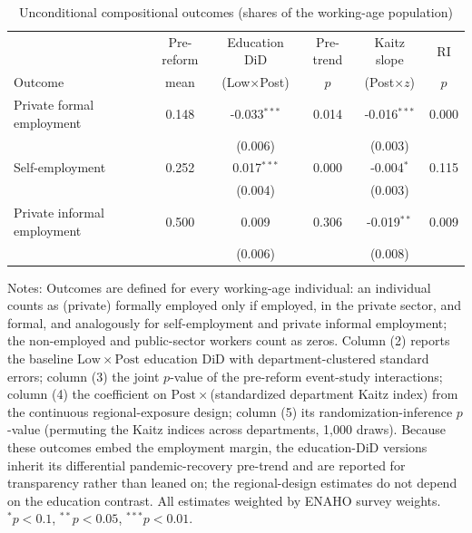 \begin{table}[!tbp]\centering
\caption{Unconditional compositional outcomes (shares of the working-age population)}\label{tab:uncond}
\begin{threeparttable}
\footnotesize
\setlength{\tabcolsep}{4pt}
\begin{tabular}{lccccc}
\toprule
& Pre-reform & Education DiD & Pre-trend & Kaitz slope & RI \\
Outcome & mean & (Low$\times$Post) & $p$ & (Post$\times z$) & $p$ \\
\midrule
Private formal employment & 0.148 & -0.033$^{***}$ & 0.014 & -0.016$^{***}$ & 0.000 \\
 & & (0.006) & & (0.003) & \\
Self-employment & 0.252 & 0.017$^{***}$ & 0.000 & -0.004$^{*}$ & 0.115 \\
 & & (0.004) & & (0.003) & \\
Private informal employment & 0.500 & 0.009 & 0.306 & -0.019$^{**}$ & 0.009 \\
 & & (0.006) & & (0.008) & \\
\bottomrule
\end{tabular}
\begin{tablenotes}\footnotesize
\item Notes: Outcomes are defined for every working-age individual: an individual counts as (private) formally employed only if employed, in the private sector, and formal, and analogously for self-employment and private informal employment; the non-employed and public-sector workers count as zeros. Column (2) reports the baseline $\mathrm{Low}\times\mathrm{Post}$ education DiD with department-clustered standard errors; column (3) the joint $p$-value of the pre-reform event-study interactions; column (4) the coefficient on $\mathrm{Post}\times$(standardized department Kaitz index) from the continuous regional-exposure design; column (5) its randomization-inference $p$-value (permuting the Kaitz indices across departments, 1{,}000 draws). Because these outcomes embed the employment margin, the education-DiD versions inherit its differential pandemic-recovery pre-trend and are reported for transparency rather than leaned on; the regional-design estimates do not depend on the education contrast. All estimates weighted by ENAHO survey weights. $^{*}p<0.1$, $^{**}p<0.05$, $^{***}p<0.01$.
\end{tablenotes}
\end{threeparttable}\end{table}
